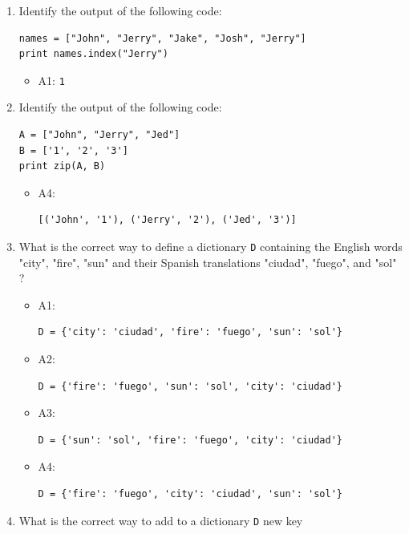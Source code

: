 \documentclass[article,A4,12pt]{llncs}
\begin{document}
\begin{enumerate}
\begin{verbatim}
print names.count("Jerry")
\end{verbatim}
  \begin{itemize}
    \item A2: {\tt 2}
  \end{itemize}
\item Identify the output of the following code:
\begin{verbatim}
names = ["John", "Jerry", "Jake", "Josh", "Jerry"]
print names.index("Jerry")
\end{verbatim}
  \begin{itemize}
    \item A1: {\tt 1}
  \end{itemize}
\item Identify the output of the following code:
\begin{verbatim}
A = ["John", "Jerry", "Jed"]
B = ['1', '2', '3']
print zip(A, B)
\end{verbatim}
  \begin{itemize}
    \item A4:
\begin{verbatim}
[('John', '1'), ('Jerry', '2'), ('Jed', '3')]
\end{verbatim}
  \end{itemize}
\item What is the correct way to define a dictionary {\tt D} containing the 
      English words "city", "fire", "sun" and their Spanish translations "ciudad",
      "fuego", and "sol" ?
  \begin{itemize}
    \item A1:
\begin{verbatim}
D = {'city': 'ciudad', 'fire': 'fuego', 'sun': 'sol'}
\end{verbatim}
    \item A2:
\begin{verbatim}
D = {'fire': 'fuego', 'sun': 'sol', 'city': 'ciudad'}
\end{verbatim}
    \item A3:
\begin{verbatim}
D = {'sun': 'sol', 'fire': 'fuego', 'city': 'ciudad'}
\end{verbatim}
    \item A4:
\begin{verbatim}
D = {'fire': 'fuego', 'city': 'ciudad', 'sun': 'sol'}
\end{verbatim}
  \end{itemize}
\item What is the correct way to add to a dictionary {\tt D} new key 

\end{enumerate}
\end{document}
